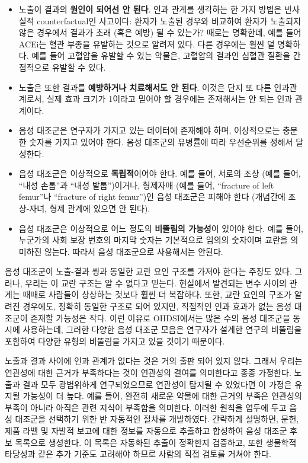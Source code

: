 \documentclass[10.5pt]{book}
\providecommand{\tightlist}{%
  \setlength{\itemsep}{0pt}\setlength{\parskip}{0pt}}
\theoremstyle{definition}
\theoremstyle{definition}
\theoremstyle{definition}
\theoremstyle{remark}
\begin{document}
\begin{itemize}
\tightlist
\item
  노출이 결과의 \textbf{원인이 되어선 안 된다}. 인과 관계를 생각하는 한
  가지 방법은 반사실적 counterfactual인 사고이다: 환자가 노출된 경우와
  비교하여 환자가 노출되지 않은 경우에서 결과가 초래 (혹은 예방) 될 수
  있는가? 때로는 명확한데, 예를 들어 ACEi는 혈관 부종을 유발하는 것으로
  알려져 있다. 다른 경우에는 훨씬 덜 명확하다. 예를 들어 고혈압을 유발할
  수 있는 약물은, 고혈압의 결과인 심혈관 질환을 간접적으로 유발할 수
  있다.
\item
  노출은 또한 결과를 \textbf{예방하거나 치료해서도 안 된다}. 이것은 단지
  또 다른 인과관계로서, 실제 효과 크기가 1이라고 믿어야 할 경우에는
  존재해서는 안 되는 인과 관계이다.
\item
  음성 대조군은 연구자가 가지고 있는 데이터에 존재해야 하며,
  이상적으로는 충분한 숫자를 가지고 있어야 한다. 음성 대조군의 유병률에
  따라 우선순위를 정해서 달성한다.
\item
  음성 대조군은 이상적으로 \textbf{독립적}이어야 한다. 예를 들어, 서로의
  조상 (예를 들어, ``내성 손톱''과 ``내성 발톱'')이거나, 형제자매 (예를
  들어, ``fracture of left femur''나 ``fracture of right femur'')인 음성
  대조군은 피해야 한다 (개념간에 조상-자녀, 형제 관계에 있으면 안 된다).
\item
  음성 대조군은 이상적으로 어느 정도의 \textbf{비뚤림의 가능성}이 있어야
  한다. 예를 들어, 누군가의 사회 보장 번호의 마지막 숫자는 기본적으로
  임의의 숫자이며 교란을 의미하진 않는다. 따라서 음성 대조군으로
  사용해서는 안된다.
\end{itemize}

음성 대조군이 노출-결과 쌍과 동일한 교란 요인 구조를 가져야 한다는
주장도 있다. \citep{lipsitch_2010} 그러나, 우리는 이 교란 구조는 알 수
없다고 믿는다. 현실에서 발견되는 변수 사이의 관계는 때때로 사람들이
상상하는 것보다 훨씬 더 복잡하다. 또한, 교란 요인의 구조가 알려진
경우에도, 정확히 동일한 구조로 되어 있지만, 직접적인 인과 효과가 없는
음성 대조군이 존재할 가능성은 작다. 이런 이유로 OHDSI에서는 많은 수의
음성 대조군을 동시에 사용하는데, 그러한 다양한 음성 대조군 모음은
연구자가 설계한 연구의 비뚤림을 포함하여 다양한 유형의 비뚤림을 가지고
있을 것이기 때문이다.

노출과 결과 사이에 인과 관계가 없다는 것은 거의 출판 되어 있지 않다.
그래서 우리는 연관성에 대한 근거가 부족하다는 것이 연관성의 결여를
의미한다고 종종 가정한다. 노출과 결과 모두 광범위하게 연구되었으므로
연관성이 탐지될 수 있었다면 이 가정은 유지될 가능성이 더 높다. 예를
들어, 완전히 새로운 약물에 대한 근거의 부족은 연관성의 부족이 아니라
아직은 관련 지식이 부족함을 의미한다. 이러한 원칙을 염두에 두고 음성
대조군을 선택하기 위한 반 자동적인 절차를 개발하였다. \citep{voss_2016}
간략하게 설명하면, 문헌, 제품 라벨 및 자발적 보고에 대한 정보를 자동으로
추출하고 합성하여 음성 대조군 후보 목록으로 생성한다. 이 목록은 자동화된
추출이 정확한지 검증하고, 또한 생물학적 타당성과 같은 추가 기준도
고려해야 하므로 사람의 직접 검토를 거쳐야 한다.
\end{document}
